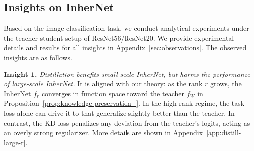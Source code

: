 \documentclass{article} %
\begin{document}
\subsection{Insights on InherNet}
\label{sec:observation}


Based on the image classification task, we conduct analytical experiments under the teacher-student setup of ResNet56/ResNet20. We provide experimental details and results for all insights in Appendix~\ref{sec:observations}. The observed insights are as follows.


\textbf{Insight 1.} \textit{Distillation benefits small-scale InherNet, but harms the performance of large-scale InherNet.} It is aligned with our theory: as the rank $r$ grows, the InherNet $f_r$ converges in function space toward the teacher $f_W$ in Proposition~\ref{prop:knowledge-preservation_}. In the high-rank regime, the task loss alone can drive it to that generalize slightly better than the teacher. In contrast, the KD loss penalizes any deviation from the teacher's logits, acting as an overly strong regularizer. More details are shown in Appendix~\ref{app:distill-large-r}.

\end{document}
